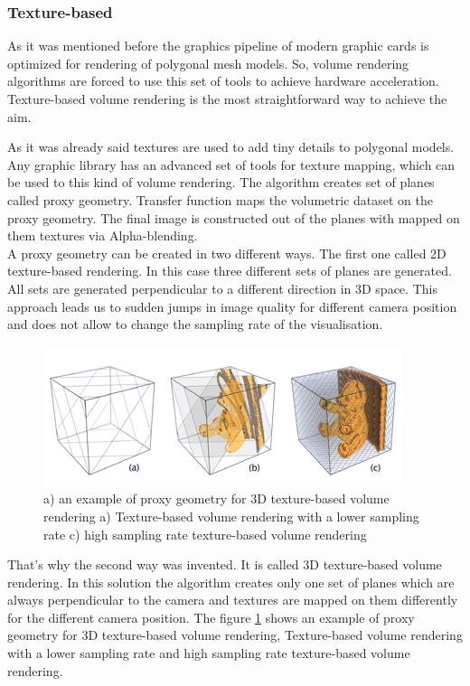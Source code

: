 \documentclass[twoside, english, 11pt]{report}
\begin{document}
\subsubsection{Texture-based}

As it was mentioned before the graphics pipeline of modern graphic cards is optimized for rendering of polygonal mesh models. So, volume rendering algorithms are forced to use this set of tools to achieve hardware acceleration. Texture-based volume rendering is the most straightforward way to achieve the aim.\

As it was already said textures are used to add tiny details to polygonal models. Any graphic library has an advanced set of tools for texture mapping, which can be used to this kind of volume rendering. The algorithm creates set of planes called proxy geometry. Transfer function maps the volumetric dataset on the proxy geometry. The final image is constructed out of the planes with mapped on them textures via Alpha-blending.\\

A proxy geometry can be created in two different ways. The first one called 2D texture-based rendering. In this case three different sets of planes are generated. All sets are generated perpendicular to a different direction in 3D space. This approach leads us to sudden jumps in image quality for different camera position and does not allow to change the sampling rate of the visualisation.\\
\begin{figure}[!h]
\centerline{
\includegraphics[scale=0.7]{img/texture-based}
}
\caption{a) an example of proxy geometry for 3D texture-based volume rendering a) Texture-based volume rendering with a lower sampling rate c) high sampling rate texture-based volume rendering\label{fig:text}}
\end{figure}
That's why the second way was invented. It is called 3D texture-based volume rendering. In this solution the algorithm creates only one set of planes which are always perpendicular to the camera and textures are mapped on them differently for the different camera position. The figure \ref{fig:text} shows an example of proxy geometry for 3D texture-based volume rendering, Texture-based volume rendering with a lower sampling rate and high sampling rate texture-based volume rendering.\\
\end{document}
